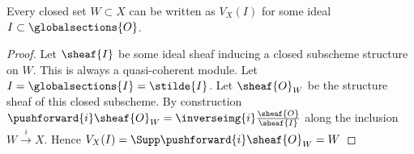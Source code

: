\begin{lemma}
Every closed set $W \subset X$ can be written as $V_X(I)$ for some ideal $I \subset \globalsections{O}$.
\end{lemma}
\begin{proof}
Let $\sheaf{I}$ be some ideal sheaf inducing a closed subscheme structure on $W$.
This is always a quasi-coherent module.
Let $I = \globalsections{I} = \stilde{I}$.
Let $\sheaf{O}_W$ be the structure sheaf of this closed subscheme. 
By construction $\pushforward{i}\sheaf{O}_W  = {\inverseimg{i}}\frac{\sheaf{O}}{\sheaf{I}}$ 
along the inclusion $W\xrightarrow{i} X$.
Hence $V_X(I) = \Supp\pushforward{i}\sheaf{O}_W = W $
\end{proof}